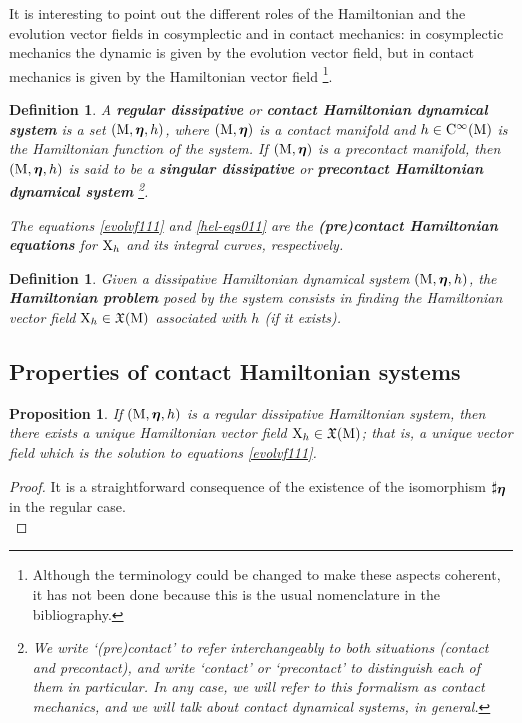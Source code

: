 \documentclass[12pt]{report}
\newtheorem{prop}[teor]{Proposition}
\newtheorem{definition}[teor]{Definition}
\def\qed{\ifvmode\removelastskip\fi
{\unskip\nobreak\hfil\penalty50\hbox{}\nobreak\hfil
\hbox{\vrule height1.2ex width1.2ex}\parfillskip=0pt
\finalhyphendemerits=0 \par\smallskip}}
\def\vf{\mathfrak X}
\def\bmeta{\mbox{\boldmath $\eta$}}
\def\X{{\rm X}}
\def\Cinfty{{\rm C}^\infty}
\begin{document}
It is interesting to point out the different roles of the Hamiltonian and the evolution vector fields in cosymplectic and in contact mechanics:
in cosymplectic mechanics the dynamic is given by  the evolution vector field, but in contact mechanics is given by the Hamiltonian vector field
\footnote{
Although the terminology could be changed to make these aspects coherent, it has not been done because this is the usual nomenclature in the bibliography.
}.

\begin{definition}
A {\sl \textbf{regular dissipative}} or {\sl \textbf{contact Hamiltonian dynamical system}}
is a set $({\rm M},\bmeta,h)$,
where $({\rm M},\bmeta)$ is a contact manifold 
and $h\in\Cinfty({\rm M})$ is the Hamiltonian function of the system.
If $({\rm M},\bmeta)$ is a precontact manifold, then $({\rm M},\bmeta,h)$
is said to be a {\sl \textbf{singular dissipative}} or {\sl \textbf{precontact Hamiltonian dynamical system}}
\footnote{
We write ‘(pre)contact’ to refer interchangeably to both situations (contact and precontact), and write ‘contact’ or ‘precontact’ to distinguish each of them in particular.
In any case, we will refer to this formalism as {\sl contact mechanics}, and we will talk about {\sl contact dynamical systems}, in general.
}.

The equations 
\eqref{evolvf111} and \eqref{hel-eqs011}
are the {\sl \textbf{(pre)contact Hamiltonian equations}} 
for $\X_h$ and its integral curves, respectively.
\label{stdhrbis}
\end{definition}

\begin{definition}
Given a dissipative Hamiltonian dynamical system $({\rm M},\bmeta,h)$, 
the \textbf{Hamiltonian problem} posed by  the system
consists in finding the Hamiltonian vector field $\X_h \in \vf ({\rm M})$
associated with $h$ (if it exists).
\end{definition}


\subsection{Properties of contact Hamiltonian systems}


\begin{prop}
\label{teo-evoeqs1}
If $({\rm M},\bmeta,h)$ is a regular dissipative Hamiltonian system, 
then there exists a unique Hamiltonian vector field $\X_h\in\vf({\rm M})$;
that is, a unique vector field which is the solution to equations \eqref{evolvf111}.
\end{prop}
\begin{proof}
It is a straightforward consequence of the existence of the isomorphism $\sharp_{\bmeta}$ in the regular case.
\\ \qed \end{proof}
\end{document}
